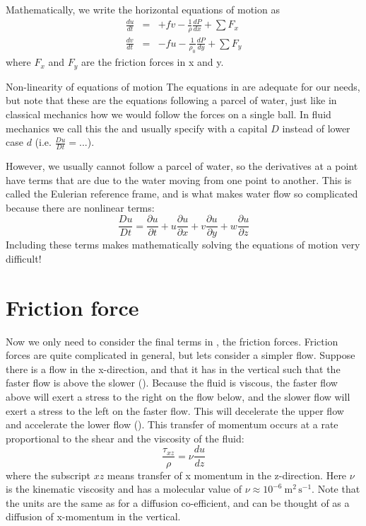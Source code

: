 Mathematically, we write the horizontal equations of motion as 
\begin{eqnarray}
    \label{eq:motion}
    \frac{du}{dt} & = & +fv  - \frac{1}{\rho}\frac{dP}{dx} +  \sum F_{x}\\
    \frac{dv}{dt} & = & -fu - \frac{1}{\rho_0}\frac{dP}{dy} + \sum F_{y}
\end{eqnarray}
where $F_x$ and $F_y$ are the friction forces in x and y.  

\begin{derivbox}[label={box:nonlinear}]{Non-linearity of equations of motion}
The equations in  are adequate for our needs, but note that these are the equations following a parcel of water, just like in classical mechanics how we would follow the forces on a single ball. In fluid mechanics we call this the  and usually specify with a capital $D$ instead of lower case $d$ (i.e. $\frac{Du}{Dt}=...$).  

However, we usually cannot follow a parcel of water, so the derivatives at a point have terms that are due to the water moving from one point to another.  This is called the Eulerian reference frame, and is what makes water flow so complicated because there are nonlinear terms:
\begin{equation}
    \frac{Du}{Dt} = \frac{\partial u}{\partial t} + u\frac{\partial u}{\partial x} + v\frac{\partial u}{\partial y} + w\frac{\partial u}{\partial z}
\end{equation}
Including these terms makes mathematically solving the equations of motion very difficult!
\end{derivbox}


\section{Friction force}

Now we only need to consider the final terms in , the friction forces.  Friction forces are quite complicated in general, but lets consider a simpler flow.  Suppose there is a flow in the x-direction, and that it has  in the vertical such that the faster flow is above the slower ().  Because the fluid is viscous, the faster flow above will exert a stress to the right on the flow below, and the slower flow will exert a stress to the left on the faster flow.  This will decelerate the upper flow and accelerate the lower flow ().  This transfer of momentum occurs at a rate proportional to the shear and the viscosity of the fluid:
\begin{equation}
    \frac{\tau_{xz}}{\rho} = \nu \frac{du}{dz}
\end{equation}
where the subscript $xz$ means transfer of x momentum in the z-direction.  Here $\nu$ is the kinematic viscosity and has a molecular value of $\nu \approx 10^{-6}\ \mathrm{m^2\,s^{-1}}$.  Note that the units are the same as for a diffusion co-efficient, and can be thought of as a diffusion of x-momentum in the vertical. 

